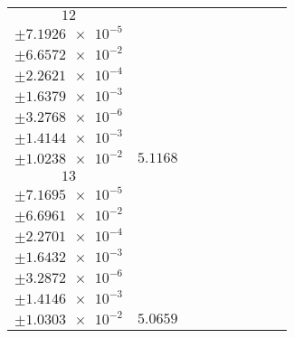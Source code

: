 \documentclass[8pt]{article}
\begin{document}
\begin{longtable}[l]{c c c c c c c c c}
$\num{12}$ & \begin{tabular}[c]{@{}c@{}}$\num{6.2179e-2}$ \\ $\pm\num{7.1926e-5}$\end{tabular} & \begin{tabular}[c]{@{}c@{}}$\num{0.17639}$ \\ $\pm\num{6.6572e-2}$\end{tabular} & \begin{tabular}[c]{@{}c@{}}$\num{-0.95487}$ \\ $\pm\num{2.2621e-4}$\end{tabular} & \begin{tabular}[c]{@{}c@{}}$\num{1.98e+3}$ \\ $\pm\num{1.6379e-3}$\end{tabular} & \begin{tabular}[c]{@{}c@{}}$\num{3.9611}$ \\ $\pm\num{3.2768e-6}$\end{tabular} & \begin{tabular}[c]{@{}c@{}}$\num{1.177}$ \\ $\pm\num{1.4144e-3}$\end{tabular} & \begin{tabular}[c]{@{}c@{}}$\num{4.2355}$ \\ $\pm\num{1.0238e-2}$\end{tabular} & $\num{5.1168}$\\
$\num{13}$ & \begin{tabular}[c]{@{}c@{}}$\num{6.1615e-2}$ \\ $\pm\num{7.1695e-5}$\end{tabular} & \begin{tabular}[c]{@{}c@{}}$\num{0.22154}$ \\ $\pm\num{6.6961e-2}$\end{tabular} & \begin{tabular}[c]{@{}c@{}}$\num{0.95455}$ \\ $\pm\num{2.2701e-4}$\end{tabular} & \begin{tabular}[c]{@{}c@{}}$\num{1.9819e+3}$ \\ $\pm\num{1.6432e-3}$\end{tabular} & \begin{tabular}[c]{@{}c@{}}$\num{3.9649}$ \\ $\pm\num{3.2872e-6}$\end{tabular} & \begin{tabular}[c]{@{}c@{}}$\num{1.1718}$ \\ $\pm\num{1.4146e-3}$\end{tabular} & \begin{tabular}[c]{@{}c@{}}$\num{4.2149}$ \\ $\pm\num{1.0303e-2}$\end{tabular} & $\num{5.0659}$\\

\end{longtable}
\end{document}
